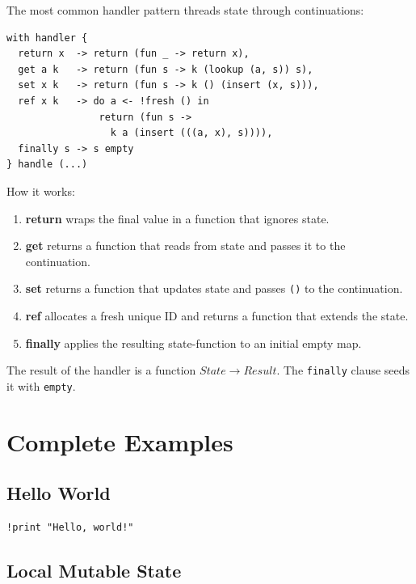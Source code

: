 \documentclass[11pt,a4paper]{article}
\newcommand{\cba}[1]{\lstinline[style=cbainline]{#1}}
\begin{document}
The most common handler pattern threads state through continuations:

\begin{lstlisting}
with handler {
  return x  -> return (fun _ -> return x),
  get a k   -> return (fun s -> k (lookup (a, s)) s),
  set x k   -> return (fun s -> k () (insert (x, s))),
  ref x k   -> do a <- !fresh () in
                return (fun s ->
                  k a (insert (((a, x), s)))),
  finally s -> s empty
} handle (...)
\end{lstlisting}

How it works:

\begin{enumerate}
  \item \textbf{return} wraps the final value in a function that ignores state.
  \item \textbf{get} returns a function that reads from state and passes it to
        the continuation.
  \item \textbf{set} returns a function that updates state and passes
        \texttt{()} to the continuation.
  \item \textbf{ref} allocates a fresh unique ID and returns a function that
        extends the state.
  \item \textbf{finally} applies the resulting state-function to an initial
        empty map.
\end{enumerate}

The result of the handler is a function
$\mathit{State} \to \mathit{Result}$.  The \cba{finally} clause seeds it with
\cba{empty}.

\section{Complete Examples}
\label{sec:examples}

\subsection{Hello World}

\begin{lstlisting}
!print "Hello, world!"
\end{lstlisting}

\subsection{Local Mutable State}
\end{document}
